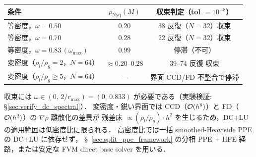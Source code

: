 \begin{tcolorbox}[resultbox, title={欠陥補正法の収束特性まとめ（DC + 直接 LU，Step 2 = \texttt{spsolve}）}]
\begin{center}
\PaperTableSetup
\begin{tabular}{lcc}
\toprule
条件 & $\rho_{\mathrm{Nyq}}(M)$ & 収束判定（tol $= 10^{-8}$） \\
\midrule
等密度，$\omega = 0.50$ & $0.20$ & 38 反復（$N=32$）収束 \\
等密度，$\omega = 0.70$ & $0.28$ & 22 反復（$N=32$）収束 \\
等密度，$\omega = 0.83\,(\omega_{\max})$ & $0.99$ & 停滞（不可） \\
変密度（$\rho_l/\rho_g = 2$，$N=64$） & $\approx 0.20$--$0.28$ & 39--74 反復 収束 \\
変密度（$\rho_l/\rho_g \ge 5$，$N=64$） & — & 界面 CCD/FD 不整合で停滞 \\
\bottomrule
\end{tabular}
\end{center}
収束には $\omega \in (0,\, 2/r_{\max}) = (0,\, 0.833)$ が必要である（実験検証: §\ref{sec:verify_dc_spectral}）．
変密度・鋭い界面では CCD（$\mathcal{O}(h^6)$）と FD（$\mathcal{O}(h^2)$）の $\nabla\rho$ 離散化の差異が
残差床 $\propto (\rho_l/\rho_g) \cdot h^2$ を生じるため，DC+LU の適用範囲は低密度比に限られる．
高密度比では一括 smoothed-Heaviside PPE の DC+LU に依存せず，
§~\ref{sec:split_ppe_framework} の分相 PPE + HFE 経路，または安定な FVM direct base solver を用いる．
\end{tcolorbox}
